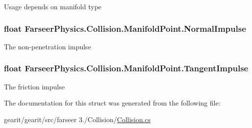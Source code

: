Usage depends on manifold type 

\hypertarget{struct_farseer_physics_1_1_collision_1_1_manifold_point_a41a8ebd48f2347b232288b1860d44319}{
\subsubsection[{Normal\+Impulse}]{\setlength{\rightskip}{0pt plus 5cm}float Farseer\+Physics.\+Collision.\+Manifold\+Point.\+Normal\+Impulse}}\label{struct_farseer_physics_1_1_collision_1_1_manifold_point_a41a8ebd48f2347b232288b1860d44319}


The non-\/penetration impulse 

\hypertarget{struct_farseer_physics_1_1_collision_1_1_manifold_point_a342d1b9cb4d364f85d89a580f83c224b}{
\subsubsection[{Tangent\+Impulse}]{\setlength{\rightskip}{0pt plus 5cm}float Farseer\+Physics.\+Collision.\+Manifold\+Point.\+Tangent\+Impulse}}\label{struct_farseer_physics_1_1_collision_1_1_manifold_point_a342d1b9cb4d364f85d89a580f83c224b}


The friction impulse 



The documentation for this struct was generated from the following file\+:\begin{DoxyCompactItemize}
\item 
gearit/gearit/src/farseer 3./\+Collision/\hyperlink{_collision_8cs}{Collision.\+cs}\end{DoxyCompactItemize}
